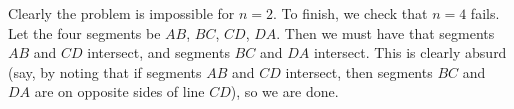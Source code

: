 Clearly the problem is impossible for $n=2$. To finish, we check that $n=4$ fails. Let the four segments be $AB$, $BC$, $CD$, $DA$. Then we must have that segments $AB$ and $CD$ intersect, and segments $BC$ and $DA$ intersect. This is clearly absurd (say, by noting that if segments $AB$ and $CD$ intersect, then segments $BC$ and $DA$ are on opposite sides of line $CD$), so we are done.

